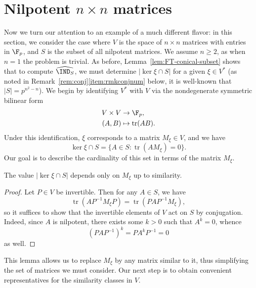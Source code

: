 \newcommand{\Mat}{\operatorname{Mat}}
\newcommand{\tr}{\operatorname{tr}}
\newcommand{\fact}{\operatorname{fact}}

\section{Nilpotent $n\times n$ matrices}\label{sec:part3}

Now we turn our attention to an example of a much different flavor: in this section, we consider the case where $V$ is the space of $n\times n$ matrices with entries in $\F_p$, and $S$ is the subset of all nilpotent matrices. We assume $n\ge 2$, as when $n=1$ the problem is trivial. As before, Lemma~\ref{lem:FT-conical-subset} shows that to compute $\widehat{\IND_S}$, we must determine $|\ker\xi\cap S|$ for a given $\xi\in V^*$ (as noted in Remark~\ref{rem:conj}\eqref{item:rmkconjnum} below, it is well-known that $|S|=p^{n^2-n}$). We begin by identifying $V^*$ with $V$ via the nondegenerate symmetric bilinear form
\begin{align*}
V\times V&\to\F_p,\\
(A,B)&\mapsto\tr(AB).
\end{align*}
Under this identification, $\xi$ corresponds to a matrix $M_\xi\in V$, and we have
\begin{equation}
\label{eqn:kerlambda}
\ker\xi\cap S=\{A\in S:\tr(AM_\xi)=0\}.
\end{equation}
Our goal is to describe the cardinality of this set in terms of the matrix $M_\xi$.
\begin{lem}
\label{lem:sim}
The value $|\ker\xi\cap S|$ depends only on $M_\xi$ up to similarity.
\end{lem}
\begin{proof}
Let $P\in V$ be invertible. Then for any $A\in S$, we have
\begin{equation*}
\tr(AP^{-1}M_\xi P)=\tr(PAP^{-1}M_\xi),
\end{equation*}
so it suffices to show that the invertible elements of $V$ act on $S$ by conjugation. Indeed, since $A$ is nilpotent, there exists some $k>0$ such that $A^k=0$, whence
\begin{equation*}
(PAP^{-1})^k=PA^kP^{-1}=0
\end{equation*}
as well.
\end{proof}
This lemma allows us to replace $M_\xi$ by any matrix similar to it, thus simplifying the set of matrices we must consider. Our next step is to obtain convenient representatives for the similarity classes in $V$.
